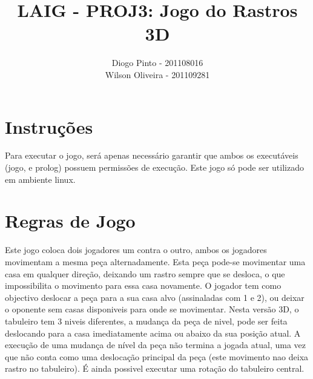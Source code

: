 \documentclass[11pt,a4paper]{report}
\begin{document}
\title{LAIG - PROJ3: Jogo do Rastros 3D}
\author{Diogo Pinto - 201108016 \\ Wilson Oliveira - 201109281}

\pagestyle{fancy}
	
\lhead{\rightmark}
\chead{}
\rhead{\leftmark}
	
\lfoot{}
\cfoot{\thepage}
\rfoot{}	

\maketitle

\section{Instruções}
Para executar o jogo, será apenas necessário garantir que ambos os executáveis (jogo, e prolog) possuem permissões de execução. 
Este jogo só pode ser utilizado em ambiente linux.

\section{Regras de Jogo}
Este jogo coloca dois jogadores um contra o outro, ambos os jogadores movimentam a mesma peça alternadamente. Esta peça pode-se movimentar uma casa em qualquer direção, deixando um rastro sempre que se desloca, o que impossibilita o movimento para essa casa novamente.
O jogador tem como objectivo deslocar a peça para a sua casa alvo (assinaladas com 1 e 2), ou deixar o oponente sem casas disponiveis para onde se movimentar.
Nesta versão 3D, o tabuleiro tem 3 niveis diferentes, a mudança da peça de nivel, pode ser feita deslocando para a casa imediatamente acima ou abaixo da sua posição atual. A execução de uma mudança de nível da peça não termina a jogada atual, uma vez que não conta como uma deslocação principal da peça (este movimento nao deixa rastro no tabuleiro). É ainda possivel executar uma rotação do tabuleiro central.
\end{document}
